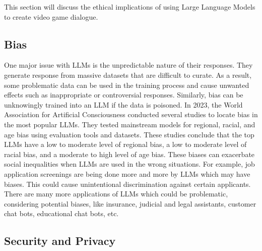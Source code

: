 \documentclass[10pt,twocolumn]{article}
\begin{document}
    \par 
    This section will discuss the ethical implications of using Large Language Models to create video game dialogue. 

    \subsection{Bias}

        \par
        One major issue with LLMs is the unpredictable nature of their responses. They generate response from massive datasets that are difficult to curate. As a result, some problematic data can be used in the training process and cause unwanted effects such as inappropriate or controversial responses. Similarly, bias can be unknowingly trained into an LLM if the data is poisoned\cite{data_poisoning}. In 2023, the World Association for Artificial Consciousness conducted several studies to locate bias in the most popular LLMs. They tested mainstream models for regional, racial, and age bias using evaluation tools and datasets. These studies conclude that the top LLMs have a low to moderate level of regional bias\cite{duan_ranking_nodate}, a low to moderate level of racial bias\cite{duan_large_nodate}, and a moderate to high level of age bias\cite{yucong_duan_large_2024}. These biases can exacerbate social inequalities when LLMs are used in the wrong situations. For example, job application screenings are being done more and more by LLMs which may have biases. This could cause unintentional discrimination against certain applicants. There are many more applications of LLMs which could be problematic, considering potential biases, like insurance, judicial and legal assistants, customer chat bots, educational chat bots, etc. 

    \subsection{Security and Privacy}
\end{document}
